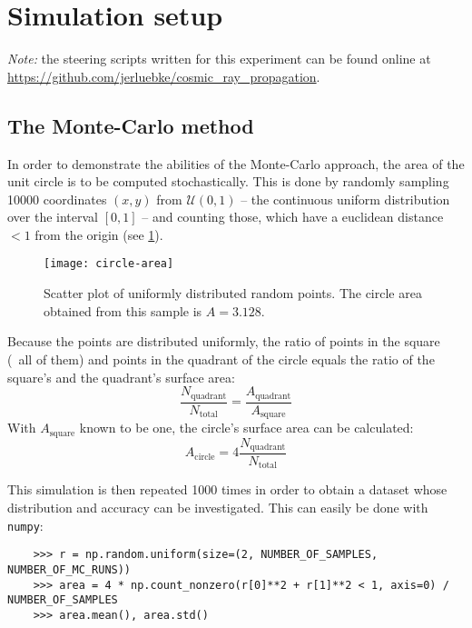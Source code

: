\section{Simulation setup}
\emph{Note:} the steering scripts written for this experiment can be found
online at \url{https://github.com/jerluebke/cosmic_ray_propagation}.
\subsection{The Monte-Carlo method}
In order to demonstrate the abilities of the Monte-Carlo approach, the area
of the unit circle is to be computed stochastically. This is done by
randomly sampling \num{10000} coordinates $(x,y)$ from $\mathcal{U}(0,1)$
-- the continuous uniform distribution over the interval $[0,1]$ -- and
counting those, which have a euclidean distance $<1$ from the origin (see
\cref{fig:circle-area-scatter}).

\begin{figure}[ht]
    \centering
    \texttt{[image: circle-area]}
    \caption{Scatter plot of uniformly distributed random points. The circle
    area obtained from this sample is $A=3.128$.}
    \label{fig:circle-area-scatter}
\end{figure}

Because the points are distributed uniformly, the ratio of points in the
square (\ie~all of them) and points in the quadrant of the circle equals the
ratio of the square's and the quadrant's surface area:
\begin{equation*}
    \frac{N_{\mathrm{quadrant}}}{N_{\mathrm{total}}}
    =\frac{A_{\mathrm{quadrant}}}{A_{\mathrm{square}}}
\end{equation*}
With $A_{\mathrm{square}}$ known to be one, the circle's surface area can
be calculated:
\begin{equation}
    A_{\mathrm{circle}}=4\frac{N_{\mathrm{quadrant}}}{N_{\mathrm{total}}}
    \label{eq:circle-area-mc}
\end{equation}

This simulation is then repeated \num{1000} times in order to
obtain a dataset whose distribution and accuracy can be investigated.
This can easily be done with \texttt{numpy}:
\begin{verbatim}
    >>> r = np.random.uniform(size=(2, NUMBER_OF_SAMPLES, NUMBER_OF_MC_RUNS))
    >>> area = 4 * np.count_nonzero(r[0]**2 + r[1]**2 < 1, axis=0) / NUMBER_OF_SAMPLES
    >>> area.mean(), area.std()
\end{verbatim}


